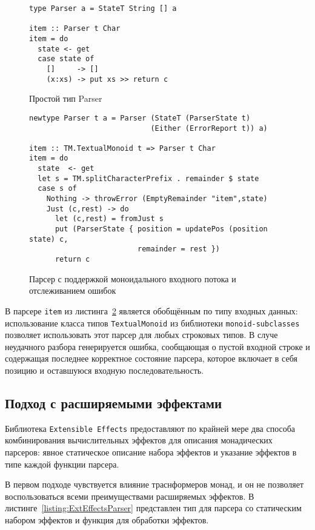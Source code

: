 \begin{figure}[t]
\begin{lstlisting}
type Parser a = StateT String [] a

item :: Parser t Char
item = do
  state <- get
  case state of
    []     -> []
    (x:xs) -> put xs >> return c
\end{lstlisting}
\caption{Простой тип Parser}
\label{listing:MonadTransItem1}
\end{figure}

\begin{figure}[t]
\begin{lstlisting}
newtype Parser t a = Parser (StateT (ParserState t) 
                            (Either (ErrorReport t)) a)

item :: TM.TextualMonoid t => Parser t Char
item = do
  state  <- get
  let s = TM.splitCharacterPrefix . remainder $ state
  case s of
    Nothing -> throwError (EmptyRemainder "item",state)
    Just (c,rest) -> do
      let (c,rest) = fromJust s
      put (ParserState { position = updatePos (position state) c, 
                         remainder = rest })
      return c
\end{lstlisting}
\caption{Парсер с поддержкой моноидального входного потока и отслеживанием ошибок}
\label{listing:MonadTransItem2}
\end{figure}

В парсере \lstinline{item} из листинга~\ref{listing:MonadTransItem2} является 
обобщённым по типу входных данных: использование класса типов 
\lstinline{TextualMonoid} из библиотеки \lstinline{monoid-subclasses} позволяет
использовать этот парсер для любых строковых типов. В случе неудачного разбора 
генерируется ошибка, сообщающая о пустой входной строке и содержащая последнее
корректное состояние парсера, которое включает в себя позицию и оставшуюся 
входную последовательность.   

\subsection{Подход с расширяемыми эффектами}

Библиотека \lstinline{Extensible Effects} предоставляют по крайней мере два 
способа комбинирования вычислительных эффектов для описания монадических 
парсеров: явное статическое описание набора эффектов и указание эффектов в типе
каждой функции парсера.

В первом подходе чувствуется влияние траснформеров монад, и он не позволяет 
воспользоваться всеми преимуществами расширяемых эффектов. 
В листинге~\ref{listing:ExtEffectsParser} представлен тип для парсера со 
статическим набором эффектов и функция для обработки эффектов.

